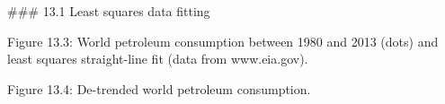 

### 13.1 Least squares data fitting

Figure 13.3: World petroleum consumption between 1980 and 2013 (dots) and least squares straight-line fit (data from www.eia.gov).

Figure 13.4: De-trended world petroleum consumption.

